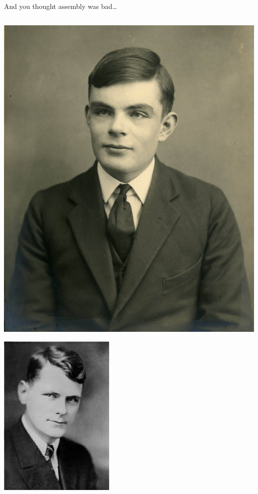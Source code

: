 \documentclass[9pt,aspectratio=169]{beamer}
\begin{document}
\begin{frame}[label={sec:org30a206b},fragile]{And you thought assembly was bad\ldots{}}
\begin{columns}
\begin{column}[t]{0.2\columnwidth}
\begin{center}
\includegraphics[width=.9\linewidth]{./turing.jpg}
\end{center}
\begin{center}
\includegraphics[width=.9\linewidth]{./church.jpg}

\end{center}
\end{column}
\end{columns}
\end{frame}
\end{document}
